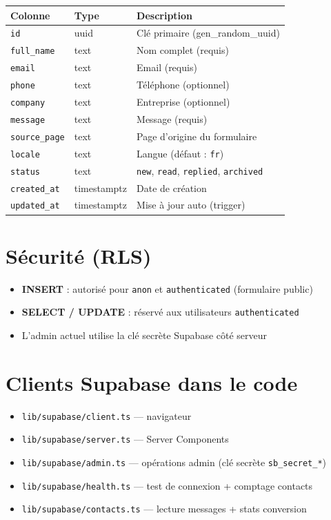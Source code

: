 \documentclass[11pt,a4paper]{report}
\begin{document}
\begin{table}[h]
\centering
\small
\begin{tabular}{@{}llp{6cm}@{}}
\toprule
\textbf{Colonne} & \textbf{Type} & \textbf{Description} \\
\midrule
\texttt{id} & uuid & Clé primaire (gen\_random\_uuid) \\
\texttt{full\_name} & text & Nom complet (requis) \\
\texttt{email} & text & Email (requis) \\
\texttt{phone} & text & Téléphone (optionnel) \\
\texttt{company} & text & Entreprise (optionnel) \\
\texttt{message} & text & Message (requis) \\
\texttt{source\_page} & text & Page d'origine du formulaire \\
\texttt{locale} & text & Langue (défaut : \texttt{fr}) \\
\texttt{status} & text & \texttt{new}, \texttt{read}, \texttt{replied}, \texttt{archived} \\
\texttt{created\_at} & timestamptz & Date de création \\
\texttt{updated\_at} & timestamptz & Mise à jour auto (trigger) \\
\bottomrule
\end{tabular}
\end{table}

\section{Sécurité (RLS)}

\begin{itemize}[leftmargin=*]
  \item \textbf{INSERT} : autorisé pour \texttt{anon} et \texttt{authenticated} (formulaire public)
  \item \textbf{SELECT / UPDATE} : réservé aux utilisateurs \texttt{authenticated}
  \item L'admin actuel utilise la clé secrète Supabase côté serveur
\end{itemize}

\section{Clients Supabase dans le code}

\begin{itemize}[leftmargin=*]
  \item \texttt{lib/supabase/client.ts} — navigateur
  \item \texttt{lib/supabase/server.ts} — Server Components
  \item \texttt{lib/supabase/admin.ts} — opérations admin (clé secrète \texttt{sb\_secret\_*})
  \item \texttt{lib/supabase/health.ts} — test de connexion + comptage contacts
  \item \texttt{lib/supabase/contacts.ts} — lecture messages + stats conversion
\end{itemize}
\end{document}
